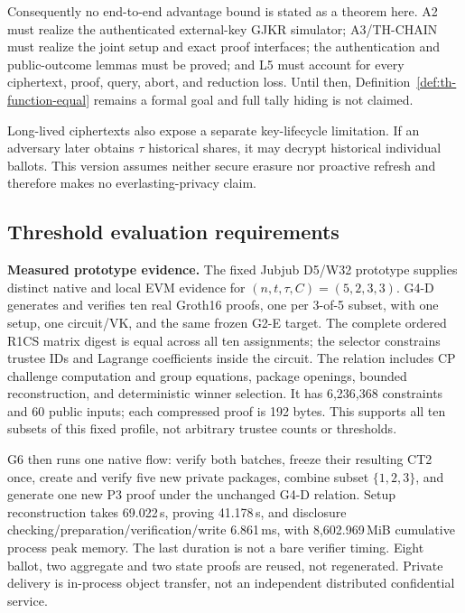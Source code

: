 \documentclass[pdflatex,sn-mathphys-num]{sn-jnl}%
\theoremstyle{thmstyleone}%
\theoremstyle{thmstyletwo}%
\theoremstyle{thmstylethree}%
\begin{document}
Consequently no end-to-end advantage bound is stated as a theorem here.  A2
must realize the authenticated external-key GJKR simulator; A3/TH-CHAIN must
realize the joint setup and exact proof interfaces; the authentication and
public-outcome lemmas must be proved; and L5 must account for every ciphertext,
proof, query, abort, and reduction loss.  Until then,
Definition~\ref{def:th-function-equal} remains a formal goal and full tally
hiding is not claimed.

Long-lived ciphertexts also expose a separate key-lifecycle limitation.  If an
adversary later obtains $\tau$ historical shares, it may decrypt historical
individual ballots.  This version assumes neither secure erasure nor proactive
refresh and therefore makes no everlasting-privacy claim.

\subsection{Threshold evaluation requirements}
\label{subsec:threshold-evaluation}

\textbf{Measured prototype evidence.}
The fixed Jubjub D5/W32 prototype supplies distinct native and local EVM
evidence for $(n,t,\tau,C)=(5,2,3,3)$. G4-D generates and verifies ten real
Groth16 proofs, one per 3-of-5 subset, with one setup, one circuit/VK, and
the same frozen G2-E target. The complete ordered R1CS matrix digest is equal
across all ten assignments; the selector constrains trustee IDs and Lagrange
coefficients inside the circuit. The relation includes CP challenge
computation and group equations, package openings, bounded reconstruction,
and deterministic winner selection. It has 6,236,368 constraints and 60 public
inputs; each compressed proof is 192 bytes. This supports all ten subsets of
this fixed profile, not arbitrary trustee counts or thresholds.

G6 then runs one native flow: verify both batches, freeze their resulting
CT2 once, create and verify five new private packages, combine subset
$\{1,2,3\}$, and generate one new P3 proof under the unchanged G4-D relation.
Setup reconstruction takes 69.022\,s, proving 41.178\,s, and disclosure
checking/preparation/verification/write 6.861\,ms, with 8,602.969\,MiB
cumulative process peak memory. The last duration is not a bare verifier
timing. Eight ballot, two aggregate and two state proofs are reused, not
regenerated. Private delivery is in-process object transfer, not an
independent distributed confidential service.
\end{document}
